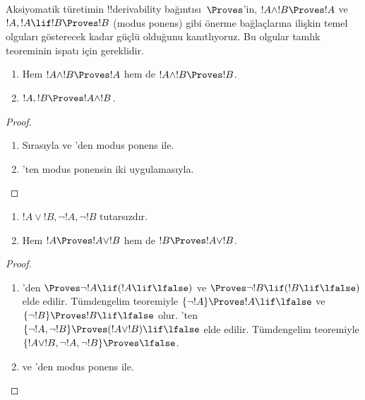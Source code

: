 

      {}
      {}


\begin{explain}
  Aksiyomatik türetimin !!{derivability} bağıntısı~$\Proves$'in,
  $!A \land !B \Proves !A$ ve $!A, !A \lif !B \Proves !B$ (modus ponens)
  gibi önerme bağlaçlarına ilişkin temel olguları gösterecek kadar güçlü
  olduğunu kanıtlıyoruz. Bu olgular tamlık teoreminin ispatı için gereklidir.
\end{explain}

\begin{prop}
  \begin{enumerate}
  \item {} Hem $!A \land !B \Proves !A$
    hem de $!A \land !B \Proves !B$.
  \item {} $!A, !B \Proves !A \land !B$.
  \end{enumerate}
\end{prop}

\begin{proof}
  \begin{enumerate}
  \item Sırasıyla  ve 'den modus
    ponens ile.
  \item {}'ten modus ponensin iki uygulamasıyla.
  \end{enumerate}
\end{proof}

\begin{prop}
  \begin{enumerate}
  \item $!A \lor !B, \lnot !A, \lnot !B$ tutarsızdır.
  \item Hem $!A \Proves !A \lor !B$ hem de $!B \Proves !A \lor !B$.
  \end{enumerate}
\end{prop}

\begin{proof}
  \begin{enumerate}
  \item {}'den $\Proves \lnot !A \lif
    (!A \lif \lfalse)$ ve $\Proves \lnot !B \lif (!B \lif \lfalse)$
    elde edilir. Tümdengelim teoremiyle $\{\lnot !A\} \Proves
    !A \lif \lfalse$ ve $\{\lnot !B\} \Proves !B \lif \lfalse$ olur.
    'ten $\{\lnot !A, \lnot !B\} \Proves
    (!A \lor !B) \lif \lfalse$ elde edilir. Tümdengelim teoremiyle
    $\{!A \lor !B, \lnot !A, \lnot !B\} \Proves \lfalse$.
  \item {} ve 'den modus ponens ile.
  \end{enumerate}
\end{proof}

